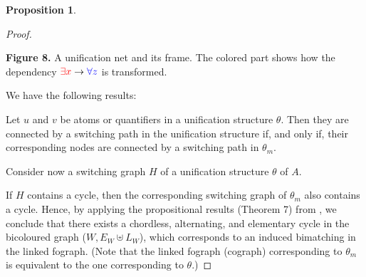 \documentclass[conference]{IEEEtran}
\theoremstyle{definition}
\newtheorem{proposition}[thm]{Proposition}
\begin{document}
\begin{proposition}
\begin{proof}
\begin{center}

{\bf Figure 8.} A unification net and its frame. The colored part shows how the dependency ${\color{red} \exists x} \rightarrow {\color{blue} \forall z}$ is transformed.
\end{center}

We have the following results: 

Let $u$ and $v$ be atoms or quantifiers in a unification structure $\theta$. Then they are connected by a switching path in the unification structure if, and only if, their corresponding nodes are connected by a switching path in $\theta_m$.

Consider now a switching graph $H$ of a unification structure $\theta$ of $A$.

If $H$ contains a cycle, then the corresponding switching graph of $\theta_m$ also contains a cycle. Hence, by applying the propositional results (Theorem 7) from \cite{Retore 2003}, we conclude that there exists a chordless, alternating, and elementary cycle in the bicoloured graph ($W, E_W \uplus L_W$), which corresponds to an induced bimatching in the linked fograph. (Note that the linked fograph (cograph) corresponding to $\theta_m$ is equivalent to the one corresponding to $\theta$.)

\end{proof}
\end{proposition}
\end{document}
